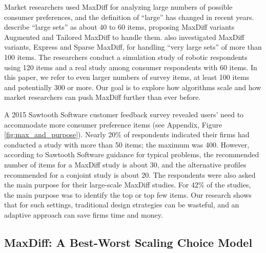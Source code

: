 \documentclass[nonblindrev]{informs3}
\begin{document}
Market researchers used MaxDiff for analyzing large numbers of possible consumer preferences, and the definition of ``large'' has changed in recent years. \cite{hendrix2007alternative} describe ``large sets'' as about 40 to 60 items, proposing MaxDiff variants Augmented and Tailored MaxDiff to handle them. \cite{wirth2012largeset} also investigated MaxDiff variants, Express and Sparse MaxDiff, for handling ``very large sets'' of more than 100 items. The researchers conduct a simulation study of robotic respondents using 120 items and a real study among consumer respondents with 60 items. In this paper, we refer to even larger numbers of survey items, at least 100 items and potentially 300 or more. Our goal is to explore how algorithms scale and how market researchers can push MaxDiff further than ever before.

A 2015 Sawtooth Software customer feedback survey revealed users' need to accommodate more consumer preference items (see Appendix, Figure \ref{fig:max_and_purpose}). Nearly 20\% of respondents indicated their firms had conducted a study with more than 50 items; the maximum was 400. However, according to Sawtooth Software guidance for typical problems, the recommended number of items for a MaxDiff study is about 30, and the alternative profiles recommended for a conjoint study is about 20. The respondents were also asked the main purpose for their large-scale MaxDiff studies. For 42\% of the studies, the main purpose was to identify the top or top few items. Our research shows that for such settings, traditional design strategies can be wasteful, and an adaptive approach can save firms time and money.





\subsection{MaxDiff: A Best-Worst Scaling Choice Model}
\end{document}
